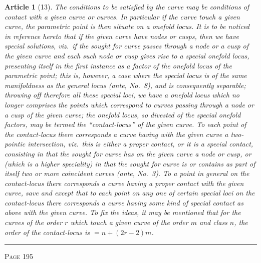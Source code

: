 \documentclass[11pt,a4paper]{article}
\theoremstyle{cayley}
\newtheorem{art}{Article}
\begin{document}
\begin{art}[13]
The conditions to be satisfied by the curve may be conditions of contact with a given curve or curves. In particular if the curve touch a given curve, the parametric point is then situate on a onefold locus. It is to be noticed in reference hereto that if the given curve have nodes or cusps, then we have special solutions, viz.\ if the sought for curve passes through a node or a cusp of the given curve and each such node or cusp gives rise to a special onefold locus, presenting itself in the first instance as a factor of the onefold locus of the parametric point; this is, however, a case where the special locus is of the same manifoldness as the general locus (ante, No.~8), and is consequently separable; throwing off therefore all these special loci, we have a onefold locus which no longer comprises the points which correspond to curves passing through a node or a cusp of the given curve; the onefold locus, so divested of the special onefold factors, may be termed the ``contact-locus'' of the given curve. To each point of the contact-locus there corresponds a curve having with the given curve a two-pointic intersection, viz.\ this is either a proper contact, or it is a special contact, consisting in that the sought for curve has on the given curve a node or cusp, or (which is a higher speciality) in that the sought for curve is or contains as part of itself two or more coincident curves (ante, No.~3). To a point in general on the contact-locus there corresponds a curve having a proper contact with the given curve, save and except that to each point on any one of certain special loci on the contact-locus there corresponds a curve having some kind of special contact as above with the given curve. To fix the ideas, it may be mentioned that for the curves of the order $r$ which touch a given curve of the order $m$ and class $n$, the order of the contact-locus is $= n + (2r-2)m$.
\end{art}

\vspace{1em}
\noindent\rule{\textwidth}{0.4pt}
\begin{center}\textsc{Page 195}\end{center}
\newpage
\end{document}
